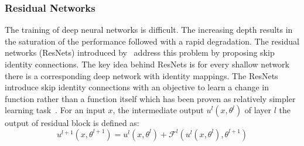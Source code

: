 




\subsubsection{Residual Networks}
\label{sub:resnet}
The training of deep neural networks is difficult. The increasing depth results in the saturation of the performance followed with a rapid degradation. The residual networks (ResNets) introduced by~\cite{he2016deep} address this problem by proposing skip identity connections. The key idea behind ResNets is for every shallow network there is a corresponding deep network with identity mappings. The ResNets introduce skip identity connections with an objective to learn a change in function rather than a function itself which has been proven as relatively simpler learning task~\cite{he2016identity}. For an input $x$, the intermediate output $u^l(x,\theta^l)$ of layer $l$ the output of residual block is defined as:
\begin{equation}
\label{eq:res}
    u^{l+1}(x,\theta^{l+1}) =  u^{l}(x,\theta^l) + \mathcal{F}^l(u^{l}(x,\theta^{l}), \theta^{l+1})
\end{equation}



